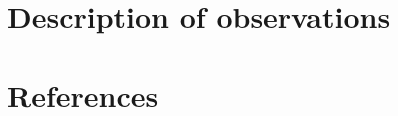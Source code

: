\documentclass[12pt,a4paper]{article}  %
\begin{document}
\section{Description of observations}


\section*{References}








\end{document}
